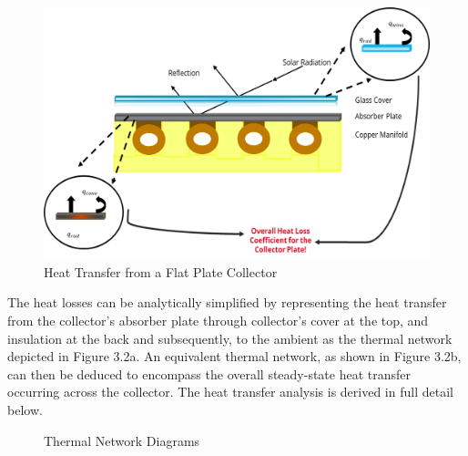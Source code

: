 \medskip
\begin{figure}[H]
    \centering
    \includegraphics[width=\textwidth]{images/flat_plate_heat_transfer.png}
    \caption{Heat Transfer from a Flat Plate Collector}
\end{figure}

\medskip
The heat losses can be analytically simplified by representing the heat transfer from the collector’s absorber plate through collector’s cover at the top, and insulation at the back and subsequently, to the ambient as the thermal network depicted in Figure 3.2a. An equivalent thermal network, as shown in Figure 3.2b, can then be deduced to encompass the overall steady-state heat transfer occurring across the collector. The heat transfer analysis is derived in full detail below.

\smallskip
\begin{figure}[H]
    \centering
    \qquad
    \caption{Thermal Network Diagrams}
\end{figure}

